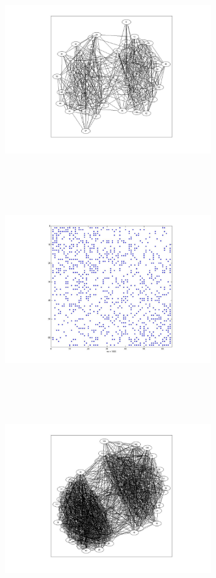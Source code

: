 \includegraphics[width=9.0cm,height=9.0cm]{images/GraphTheory/RandomGraph_WithCut_64Nodes.jpg}
\includegraphics[width=9.0cm,height=9.0cm]{images/GraphTheory/RandomGraph_WithCut_adjacencyMatrix_64Nodes.jpg}
\includegraphics[width=9.0cm,height=9.0cm]{images/GraphTheory/RandomGraph_WithCut_jpg.jpg}
